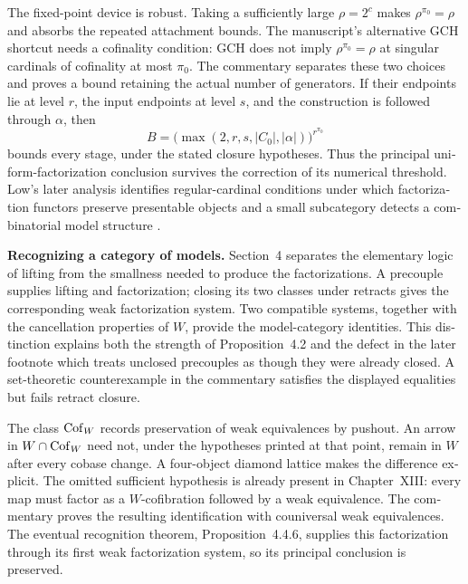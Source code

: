 \begin{otherlanguage}{english}
The fixed-point device is robust. Taking a sufficiently large $\rho=2^c$ makes $\rho^{\pi_0}=\rho$ and absorbs the repeated attachment bounds. The manuscript's alternative GCH shortcut needs a cofinality condition: GCH does not imply $\rho^{\pi_0}=\rho$ at singular cardinals of cofinality at most $\pi_0$. The commentary separates these two choices and proves a bound retaining the actual number of generators. If their endpoints lie at level $r$, the input endpoints at level $s$, and the construction is followed through $\alpha$, then
\[
 B=\bigl(\max(2,r,s,|C_0|,|\alpha|)\bigr)^{r^{\pi_0}}
\]
bounds every stage, under the stated closure hypotheses. Thus the principal uniform-factorization conclusion survives the correction of its numerical threshold. Low's later analysis identifies regular-cardinal conditions under which factorization functors preserve presentable objects and a small subcategory detects a combinatorial model structure \citep[Theorem~4.4, Theorem~5.9, Proposition~5.12]{Low2016Heart}.

\medskip\noindent\textbf{Recognizing a category of models.}
Section~4 separates the elementary logic of lifting from the smallness needed to produce the factorizations. A precouple supplies lifting and factorization; closing its two classes under retracts gives the corresponding weak factorization system. Two compatible systems, together with the cancellation properties of $W$, provide the model-category identities. This distinction explains both the strength of Proposition~4.2 and the defect in the later footnote which treats unclosed precouples as though they were already closed. A set-theoretic counterexample in the commentary satisfies the displayed equalities but fails retract closure.

The class $\mathrm{Cof}_W$ records preservation of weak equivalences by pushout. An arrow in $W\cap\mathrm{Cof}_W$ need not, under the hypotheses printed at that point, remain in $W$ after every cobase change. A four-object diamond lattice makes the difference explicit. The omitted sufficient hypothesis is already present in Chapter~XIII: every map must factor as a $W$-cofibration followed by a weak equivalence. The commentary proves the resulting identification with couniversal weak equivalences. The eventual recognition theorem, Proposition~4.4.6, supplies this factorization through its first weak factorization system, so its principal conclusion is preserved.


\end{otherlanguage}
